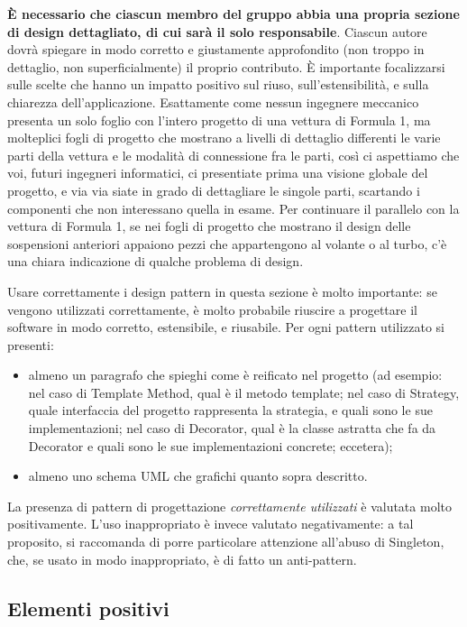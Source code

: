 \documentclass[a4paper,12pt]{report}
\begin{document}
\textbf{È necessario che ciascun membro del gruppo abbia una propria sezione di design dettagliato,
di cui sarà il solo responsabile}.
%
Ciascun autore dovrà spiegare in modo corretto e giustamente approfondito (non troppo in dettaglio, non superficialmente) il proprio contributo.
%
È importante focalizzarsi sulle scelte che hanno un impatto positivo sul riuso, sull'estensibilità, e sulla chiarezza dell'applicazione.
%
Esattamente come nessun ingegnere meccanico presenta un solo foglio con l'intero progetto di una vettura di Formula 1, ma molteplici fogli di progetto che mostrano a livelli di dettaglio differenti le varie parti della vettura e le modalità di connessione fra le parti, così ci aspettiamo che voi, futuri ingegneri informatici, ci presentiate prima una visione globale del progetto, e via via siate in grado di dettagliare le singole parti, scartando i componenti che non interessano quella in esame.
%
Per continuare il parallelo con la vettura di Formula 1, se nei fogli di progetto che mostrano il
design delle sospensioni anteriori appaiono pezzi che appartengono al volante o al turbo, c'è una
chiara indicazione di qualche problema di design.

Usare correttamente i design pattern in questa sezione è molto importante: se vengono utilizzati correttamente, è molto probabile riuscire a progettare il software in modo corretto, estensibile, e riusabile.
%
Per ogni pattern utilizzato si presenti:
\begin{itemize}
    \item almeno un paragrafo che spieghi come è reificato nel progetto (ad esempio: nel caso di Template Method, qual è il metodo template; nel caso di Strategy, quale interfaccia del progetto rappresenta la strategia, e quali sono le sue implementazioni; nel caso di Decorator, qual è la classe astratta che fa da Decorator e quali sono le sue implementazioni concrete; eccetera);
    \item almeno uno schema UML che grafichi quanto sopra descritto.
\end{itemize}
%
La presenza di pattern di progettazione \emph{correttamente utilizzati} è valutata molto positivamente.
%
L'uso inappropriato è invece valutato negativamente: a tal proposito, si raccomanda di porre particolare attenzione all'abuso di Singleton, che, se usato in modo inappropriato, è di fatto un anti-pattern.

\subsection*{Elementi positivi}
\end{document}
